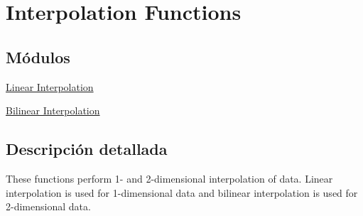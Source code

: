 \hypertarget{group__group_interpolation}{}\section{Interpolation Functions}
\label{group__group_interpolation}
\subsection*{Módulos}
\begin{DoxyCompactItemize}
\item 
\hyperlink{group___linear_interpolate}{Linear Interpolation}
\item 
\hyperlink{group___bilinear_interpolate}{Bilinear Interpolation}
\end{DoxyCompactItemize}


\subsection{Descripción detallada}
These functions perform 1-\/ and 2-\/dimensional interpolation of data. Linear interpolation is used for 1-\/dimensional data and bilinear interpolation is used for 2-\/dimensional data. 